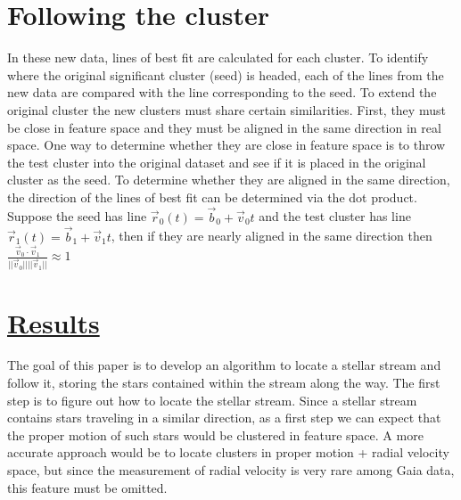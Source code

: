 \documentclass[12pt]{amsart}
\begin{document}
{\section*{Following the cluster}
\indent In these new data, lines of best fit are calculated for each cluster. To identify where the original significant cluster (seed) is headed, each of the lines from the new data are compared with the line corresponding to the seed. To extend the original cluster the new clusters must share certain similarities. First, they must be close in feature space and they must be aligned in the same direction in real space. One way to determine whether they are close in feature space is to throw the test cluster into the original dataset and see if it is placed in the original cluster as the seed. To determine whether they are aligned in the same direction, the direction of the lines of best fit can be determined via the dot product. Suppose the seed has line $\vec{r}_0(t)=\vec{b}_0+\vec{v}_0 t$ and the test cluster has line $\vec{r}_1(t)=\vec{b}_1 + \vec{v}_1 t$, then if they are nearly aligned in the same direction then 
$\frac{\vec{v}_0 \cdot \vec{v}_1 }{||\vec{v}_0|| ||\vec{v}_1||} \approx 1$
}



















\section{\underline{Results }}
	The goal of this paper is to develop an algorithm to locate a stellar stream and follow it, storing the stars contained within the stream along the way. The first step is to figure out how to locate the stellar stream. Since a stellar stream contains stars traveling in a similar direction, as a first step we can expect that the proper motion of such stars would be clustered in feature space. A more accurate approach would be to locate clusters in proper motion + radial velocity space, but since the measurement of radial velocity is very rare among Gaia data, this feature must be omitted. 
\end{document}
